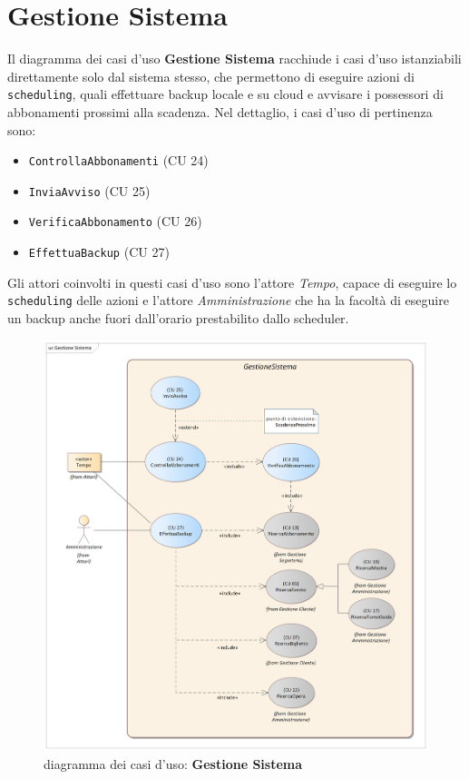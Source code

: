 \documentclass{article}
\begin{document}
	
	
	
	\newpage 

\section{Gestione Sistema}

\indent\indent Il diagramma dei casi d'uso \textbf{Gestione Sistema} racchiude i casi d'uso istanziabili direttamente solo dal sistema stesso, che permettono di eseguire azioni di \texttt{scheduling}, quali effettuare backup locale e su cloud e avvisare i possessori di abbonamenti prossimi alla scadenza. Nel dettaglio, i casi d'uso di pertinenza sono:
\medskip
\begin{itemize}[itemsep=4pt]
  \item \texttt{ControllaAbbonamenti} (CU 24)
  \item \texttt{InviaAvviso} (CU 25)
  \item \texttt{VerificaAbbonamento} (CU 26)
  \item \texttt{EffettuaBackup} (CU 27)
\end{itemize}
\medskip
Gli attori coinvolti in questi casi d'uso sono l'attore \emph{Tempo}, capace di eseguire lo \texttt{scheduling} delle azioni e l'attore \emph{Amministrazione} che ha la facoltà di eseguire un backup anche fuori dall'orario prestabilito dallo scheduler.

\begin{figure}[h]
    \centering
    \includegraphics[width=1\textwidth]{Gestione Sistema}
    \caption{diagramma dei casi d'uso: \textbf{Gestione Sistema}}
    \label{fig:GestioneSistema}
\end{figure}
\end{document}
